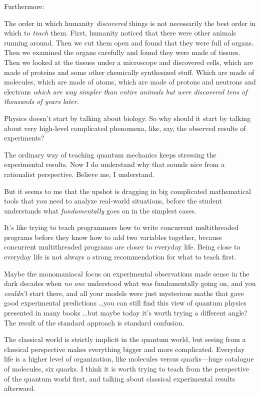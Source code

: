 {
 Furthermore:}

{
 The order in which humanity \textit{discovered} things is not
necessarily the best order in which to \textit{teach} them. First,
humanity noticed that there were other animals running around. Then we
cut them open and found that they were full of organs. Then we examined
the organs carefully and found they were made of tissues. Then we
looked at the tissues under a microscope and discovered cells, which
are made of proteins and some other chemically synthesized stuff. Which
are made of molecules, which are made of atoms, which are made of
protons and neutrons and electrons \textit{which are way simpler than
entire animals but were discovered tens of thousands of years later.}}

{
 Physics doesn't start by talking about biology. So
why should it start by talking about very high-level complicated
phenomena, like, say, the observed results of experiments?}

{
 The ordinary way of teaching quantum mechanics keeps stressing the
experimental results. Now I do understand why that sounds nice from a
rationalist perspective. Believe me, I understand.}

{
 But it seems to me that the upshot is dragging in big complicated
mathematical tools that you need to analyze real-world situations,
before the student understands what \textit{fundamentally} goes on in
the simplest cases.}

{
 It's like trying to teach programmers how to write
concurrent multithreaded programs before they know how to add two
variables together, because concurrent multithreaded programs are
closer to everyday life. Being close to everyday life is not always a
strong recommendation for what to teach first.}

{
 Maybe the monomaniacal focus on experimental observations made
sense in the dark decades when \textit{no one} understood what was
fundamentally going on, and you \textit{couldn't} start
there, and all your models were just mysterious maths that gave good
experimental predictions \ldots you can still find this view of quantum
physics presented in many books \ldots but maybe today
it's worth trying a different angle? The result of the
standard approach is standard confusion.}

{
 The classical world is strictly implicit in the quantum world, but
seeing from a classical perspective makes everything bigger and more
complicated. Everyday life is a higher level of organization, like
molecules versus quarks---huge catalogue of molecules, six quarks. I
think it is worth trying to teach from the perspective of the quantum
world first, and talking about classical experimental results
afterward.}

